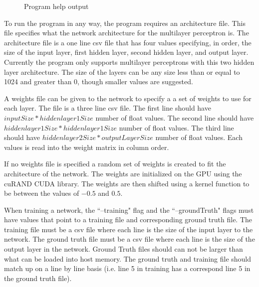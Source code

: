 \documentclass[jair, twoside,11pt,theapa]{article}
\begin{document}
\begin{figure}[h]
    \centering
    \caption{Program help output}
    \label{HelpOutput}
\end{figure}

To run the program in any way, the program requires an architecture file. 
This file specifies what the network architecture for the multilayer perceptron is. 
The architecture file is a one line csv file that has four values specifying, in order, the size of the input layer, first hidden layer, second hidden layer, and output layer. 
Currently the program only supports multilayer perceptrons with this two hidden layer architecture.
The size of the layers can be any size less than or equal to 1024 and greater than 0, though smaller values are suggested.

A weights file can be given to the network to specify a a set of weights to use for each layer. 
The file is a three line csv file. 
The first line should have $inputSize * hiddenlayer1Size$ number of float values. 
The second line should have $hiddenlayer1Size * hiddenlayer1Size$ number of float values. 
The third line should have $hiddenlayer2Size * outputLayerSize$ number of float values. 
Each values is read into the weight matrix in column order. 

If no weights file is specified a random set of weights is created to fit the architecture of the network. 
The weights are initialized on the GPU using the cuRAND CUDA library. 
The weights are then shifted using a kernel function to be between the values of $-0.5$ and $0.5$.

When training a network, the ``--training" flag and the ``--groundTruth" flags must have values that point to a training file and corresponding ground truth file. 
The training file must be a csv file where each line is the size of the input layer to the network. 
The ground truth file must be a csv file where each line is the size of the output layer in the network.
Ground Truth files should can not be larger than what can be loaded into host memory. 
The ground truth and training file should match up on a line by line basis (i.e. line 5 in training has a correspond line 5 in the ground truth file).
\end{document}
